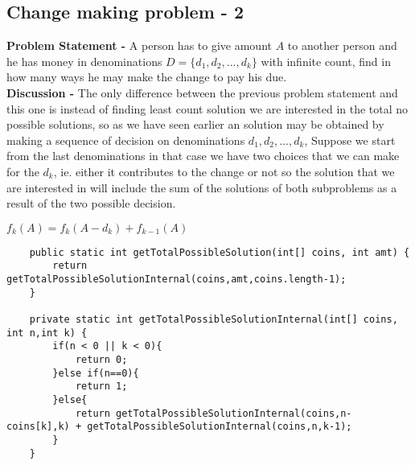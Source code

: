 \documentclass[10pt,a4paper,draft]{article}
\begin{document}
\subsection{Change making problem - 2}
\textbf{Problem Statement -} A person has to give amount $A$ to another person and he has money in denominations $D = \{d_1,d_2,...,d_k\}$ with infinite count, find in how many ways he may make the change to pay his due.
\\[12pt]
\textbf{Discussion -} The only difference between the previous problem statement and this one is instead of finding least count solution we are interested in the total no possible solutions, so as we have seen earlier an solution may be obtained by making a sequence of decision on denominations $d_1,d_2,...,d_k$, Suppose we start from the last denominations in that case we have two choices that we can make for the $d_k$, ie. either it contributes to the change or not so the solution that we are interested in will include the sum of the solutions of both subproblems as a result of the two possible decision.
\begin{center}
$f_k(A)=f_k(A-d_k) + f_{k-1}(A)$
\end{center}
\begin{lstlisting}
	public static int getTotalPossibleSolution(int[] coins, int amt) {
		return getTotalPossibleSolutionInternal(coins,amt,coins.length-1);
	}

	private static int getTotalPossibleSolutionInternal(int[] coins, int n,int k) {
		if(n < 0 || k < 0){
			return 0;
		}else if(n==0){
			return 1;
		}else{
			return getTotalPossibleSolutionInternal(coins,n-coins[k],k) + getTotalPossibleSolutionInternal(coins,n,k-1);
		}
	}
\end{lstlisting}
\end{document}
